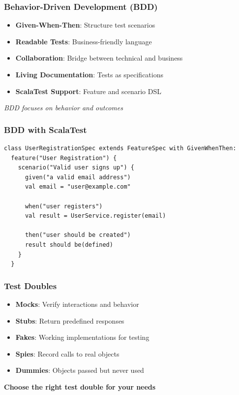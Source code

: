 \documentclass{beamer}
\begin{document}
\begin{frame}
\frametitle{Behavior-Driven Development (BDD)}

\begin{itemize}
  \item \textbf{Given-When-Then}: Structure test scenarios
  \item \textbf{Readable Tests}: Business-friendly language
  \item \textbf{Collaboration}: Bridge between technical and business
  \item \textbf{Living Documentation}: Tests as specifications
  \item \textbf{ScalaTest Support}: Feature and scenario DSL
\end{itemize}

\vspace{0.3cm}
\textit{BDD focuses on behavior and outcomes}

\end{frame}

\begin{frame}[fragile]
\frametitle{BDD with ScalaTest}

\begin{lstlisting}[style=scalaStyle]
class UserRegistrationSpec extends FeatureSpec with GivenWhenThen:
  feature("User Registration") {
    scenario("Valid user signs up") {
      given("a valid email address")
      val email = "user@example.com"
      
      when("user registers")
      val result = UserService.register(email)
      
      then("user should be created")
      result should be(defined)
    }
  }
\end{lstlisting}

\end{frame}

\begin{frame}
\frametitle{Test Doubles}

\begin{itemize}
  \item \textbf{Mocks}: Verify interactions and behavior
  \item \textbf{Stubs}: Return predefined responses
  \item \textbf{Fakes}: Working implementations for testing
  \item \textbf{Spies}: Record calls to real objects
  \item \textbf{Dummies}: Objects passed but never used
\end{itemize}

\vspace{0.3cm}
\textbf{Choose the right test double for your needs}

\end{frame}
\end{document}

